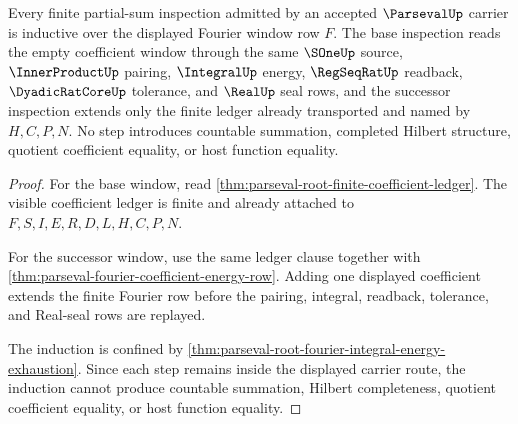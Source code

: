 \begin{theorem}
\label{thm:parseval-finite-partial-sum-induction}
Every finite partial-sum inspection admitted by an accepted $\ParsevalUp$ carrier is inductive over the displayed Fourier window row $F$. The base inspection reads the empty coefficient window through the same $\SOneUp$ source, $\InnerProductUp$ pairing, $\IntegralUp$ energy, $\RegSeqRatUp$ readback, $\DyadicRatCoreUp$ tolerance, and $\RealUp$ seal rows, and the successor inspection extends only the finite ledger already transported and named by $H,C,P,N$. No step introduces countable summation, completed Hilbert structure, quotient coefficient equality, or host function equality.
\end{theorem}
\begin{proof}
For the base window, read \autoref{thm:parseval-root-finite-coefficient-ledger}. The visible coefficient ledger is finite and already attached to $F,S,I,E,R,D,L,H,C,P,N$.

For the successor window, use the same ledger clause together with \autoref{thm:parseval-fourier-coefficient-energy-row}. Adding one displayed coefficient extends the finite Fourier row before the pairing, integral, readback, tolerance, and Real-seal rows are replayed.

The induction is confined by \autoref{thm:parseval-root-fourier-integral-energy-exhaustion}. Since each step remains inside the displayed carrier route, the induction cannot produce countable summation, Hilbert completeness, quotient coefficient equality, or host function equality.
\end{proof}

